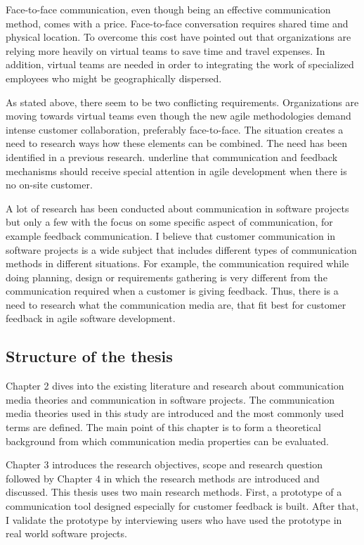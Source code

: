 \documentclass[english,12pt,a4paper,pdftex]{article}
\begin{document}
Face-to-face communication, even though being an effective communication method, comes with a price. Face-to-face conversation requires shared time and physical location. To overcome this cost \citet{derosa2004} have pointed out that organizations are relying more heavily on virtual teams to save time and travel expenses. In addition, virtual teams are needed in order to integrating the work of specialized employees who might be geographically dispersed. 

As stated above, there seem to be two conflicting requirements. Organizations are moving towards virtual teams even though the new agile methodologies demand intense customer collaboration, preferably face-to-face. The situation creates a need to research ways how these elements can be combined. The need has been identified in a previous research. \citet{korkala2006} underline that communication and feedback mechanisms should receive special attention in agile development when there is no on-site customer.

A lot of research has been conducted about communication in software projects but only a few with the focus on some specific aspect of communication, for example feedback communication. I believe that customer communication in software projects is a wide subject that includes different types of communication methods in different situations. For example, the communication required while doing planning, design or requirements gathering is very different from the communication required when a customer is giving feedback. Thus, there is a need to research what the communication media are, that fit best for customer feedback in agile software development.

\subsection{Structure of the thesis}

Chapter 2 dives into the existing literature and research about communication media theories and communication in software projects. The communication media theories used in this study are introduced and the most commonly used terms are defined. The main point of this chapter is to form a theoretical background from which communication media properties can be evaluated.

Chapter 3 introduces the research objectives, scope and research question followed by Chapter 4 in which the research methods are introduced and discussed. This thesis uses two main research methods. First, a  prototype of a communication tool designed especially for customer feedback is built. After that, I validate the prototype by interviewing users who have used the prototype in real world software projects.
\end{document}
